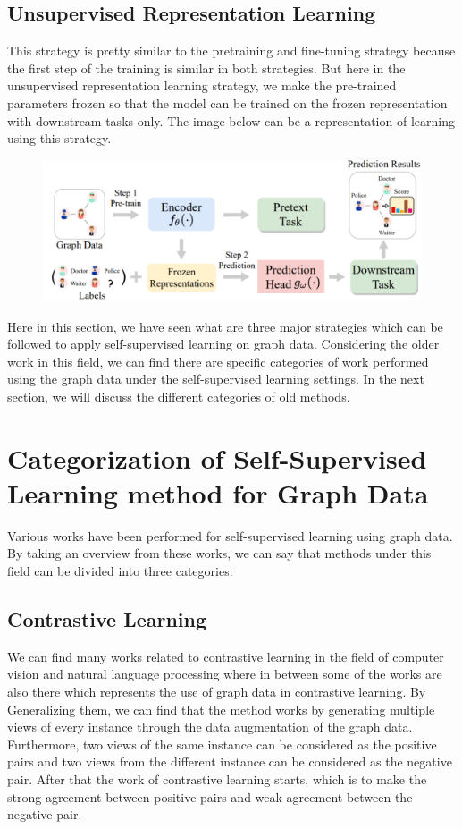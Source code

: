\documentclass[a4paper,11pt]{report}
\begin{document}
\section{Unsupervised Representation Learning}
This strategy is pretty similar to the pretraining and fine-tuning strategy because the first step of the training is similar in both strategies. But here in the unsupervised representation learning strategy, we make the pre-trained parameters frozen so that the model can be trained on the frozen representation with downstream tasks only. The image below can be a representation of learning using this strategy.
\begin{figure}[h]
	\centering
	\hspace{21pt}
	\includegraphics[width=.70\linewidth]{ssgnn3.png}
\end{figure}

Here in this section, we have seen what are three major strategies which can be followed to apply self-supervised learning on graph data. Considering the older work in this field, we can find there are specific categories of work performed using the graph data under the self-supervised learning settings. In the next section, we will discuss the different categories of old methods.

\chapter{Categorization of Self-Supervised Learning method for Graph Data}

Various works have been performed for self-supervised learning using graph data. By taking an overview from these works, we can say that methods under this field can be divided into three categories:

\section{Contrastive Learning}
We can find many works related to contrastive learning in the field of computer vision and natural language processing where in between some of the works are also there which represents the use of graph data in contrastive learning. By Generalizing them, we can find that the method works by generating multiple views of every instance through the data augmentation of the graph data. Furthermore, two views of the same instance can be considered as the positive pairs and two views from the different instance can be considered as the negative pair. After that the work of contrastive learning starts, which is to make the strong agreement between positive pairs and weak agreement between the negative pair.
\end{document}
